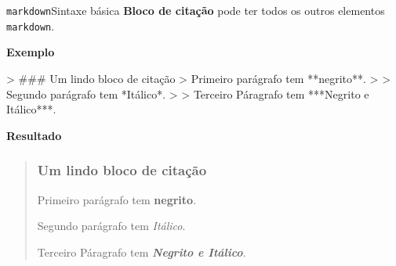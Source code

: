 \documentclass[
  10pt,
  ignorenonframetext,
]{beamer}
\newenvironment{Shaded}{\begin{snugshade}}{\end{snugshade}}
\newcommand{\AttributeTok}[1]{\textcolor[rgb]{0.40,0.45,0.13}{#1}}
\begin{document}
\begin{frame}[fragile]{\texttt{markdown}\newline Sintaxe básica}
\protect\hypertarget{markdownsintaxe-buxe1sica-6}{}
\textbf{Bloco de citação} pode ter todos os outros elementos
\texttt{markdown}.

\textbf{Exemplo}

\begin{Shaded}
\begin{Highlighting}[]
\AttributeTok{\textgreater{} \#\#\# Um lindo bloco de citação}
\AttributeTok{\textgreater{} Primeiro parágrafo tem **negrito**.}
\AttributeTok{\textgreater{}}
\AttributeTok{\textgreater{} Segundo parágrafo tem *Itálico*.}
\AttributeTok{\textgreater{}}
\AttributeTok{\textgreater{} Terceiro Páragrafo tem ***Negrito e Itálico***.}
\end{Highlighting}
\end{Shaded}

\textbf{Resultado}

\begin{quote}
\hypertarget{um-lindo-bloco-de-citauxe7uxe3o}{%
\subsubsection{Um lindo bloco de
citação}\label{um-lindo-bloco-de-citauxe7uxe3o}}

Primeiro parágrafo tem \textbf{negrito}.

Segundo parágrafo tem \emph{Itálico}.

Terceiro Páragrafo tem \textbf{\emph{Negrito e Itálico}}.
\end{quote}
\end{frame}
\end{document}
